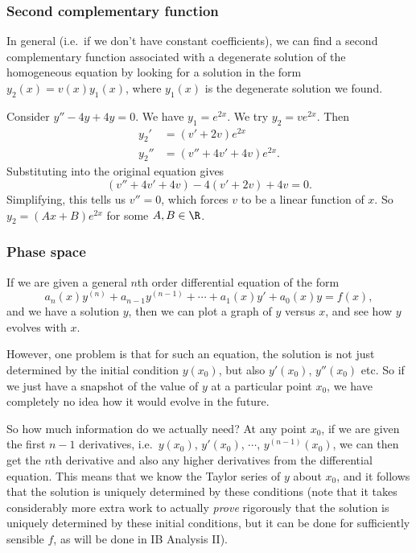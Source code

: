 \documentclass[a4paper]{article}
\begin{document}
\subsubsection{Second complementary function}
In general (i.e.\ if we don't have constant coefficients), we can find a second complementary function associated with a degenerate solution of the homogeneous equation by looking for a solution in the form $y_2(x) = v(x) y_1(x)$, where $y_1(x)$ is the degenerate solution we found.

\begin{eg}
  Consider $y'' - 4y + 4y = 0$. We have $y_1 = e^{2x}$. We try $y_2 = ve^{2x}$. Then
  \begin{align*}
    y_2' &= (v' + 2v)e^{2x}\\
    y_2'' &= (v'' + 4v' + 4v)e^{2x}.
  \end{align*}
  Substituting into the original equation gives
  \[
    (v'' + 4v' + 4v) - 4(v' + 2v) + 4v = 0.
  \]
  Simplifying, this tells us $v'' = 0$, which forces $v$ to be a linear function of $x$. So $y_2 = (Ax + B)e^{2x}$ for some $A, B \in \R$.
\end{eg}

\subsubsection{Phase space}
If we are given a general $n$th order differential equation of the form
\[
  a_n(x) y^{(n)} + a_{n - 1}y^{(n - 1)} + \cdots + a_1(x) y' + a_0 (x) y = f(x),
\]
and we have a solution $y$, then we can plot a graph of $y$ versus $x$, and see how $y$ evolves with $x$.

However, one problem is that for such an equation, the solution is not just determined by the initial condition $y(x_0)$, but also $y'(x_0)$, $y''(x_0)$ etc. So if we just have a snapshot of the value of $y$ at a particular point $x_0$, we have completely no idea how it would evolve in the future.

So how much information do we actually need? At any point $x_0$, if we are given the first $n - 1$ derivatives, i.e.\ $y(x_0)$, $y'(x_0)$, $\cdots$, $y^{(n - 1)}(x_0)$, we can then get the $n$th derivative and also any higher derivatives from the differential equation. This means that we know the Taylor series of $y$ about $x_0$, and it follows that the solution is uniquely determined by these conditions (note that it takes considerably more extra work to actually \emph{prove} rigorously that the solution is uniquely determined by these initial conditions, but it can be done for sufficiently sensible $f$, as will be done in IB Analysis II).
\end{document}
